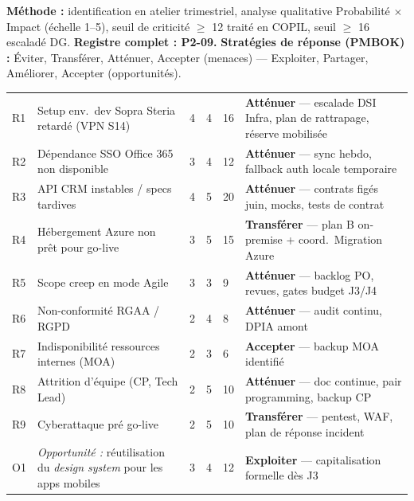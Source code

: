 \documentclass[11pt,a4paper,oneside]{report}
\begin{document}
\textbf{Méthode :} identification en atelier trimestriel, analyse qualitative Probabilité $\times$
Impact (échelle 1–5), seuil de criticité $\geq$ 12 traité en COPIL, seuil $\geq$ 16 escaladé
DG. \textbf{Registre complet : P2-09.} \textbf{Stratégies de réponse (PMBOK) :} Éviter,
Transférer, Atténuer, Accepter (menaces) — Exploiter, Partager, Améliorer, Accepter
(opportunités).

\renewcommand{\arraystretch}{1.3}
\begin{tabularx}{\textwidth}{C{0.5cm} L{3.8cm} C{1.2cm} C{1.2cm} C{0.9cm} Y}
\toprule
{}\th{\#} &  &  &  &  &  \\
\midrule
R1 & Setup env.\ dev Sopra Steria retardé (VPN S14) & 4 & 4 & 16 & \textbf{Atténuer} — escalade DSI Infra, plan de rattrapage, réserve mobilisée \\
R2 & Dépendance SSO Office 365 non disponible      & 3 & 4 & 12 & \textbf{Atténuer} — sync hebdo, fallback auth locale temporaire \\
R3 & API CRM instables / specs tardives            & 4 & 5 & 20 & \textbf{Atténuer} — contrats figés juin, mocks, tests de contrat \\
R4 & Hébergement Azure non prêt pour go-live       & 3 & 5 & 15 & \textbf{Transférer} — plan B on-premise + coord.\ Migration Azure \\
R5 & Scope creep en mode Agile                     & 3 & 3 &  9 & \textbf{Atténuer} — backlog PO, revues, gates budget J3/J4 \\
R6 & Non-conformité RGAA / RGPD                    & 2 & 4 &  8 & \textbf{Atténuer} — audit continu, DPIA amont \\
R7 & Indisponibilité ressources internes (MOA)     & 2 & 3 &  6 & \textbf{Accepter} — backup MOA identifié \\
R8 & Attrition d'équipe (CP, Tech Lead)            & 2 & 5 & 10 & \textbf{Atténuer} — doc continue, pair programming, backup CP \\
R9 & Cyberattaque pré go-live                      & 2 & 5 & 10 & \textbf{Transférer} — pentest, WAF, plan de réponse incident \\
O1 & \textit{Opportunité :} réutilisation du \textit{design system} pour les apps mobiles & 3 & 4 & 12 & \textbf{Exploiter} — capitalisation formelle dès J3 \\
\bottomrule
\end{tabularx}
\end{document}
